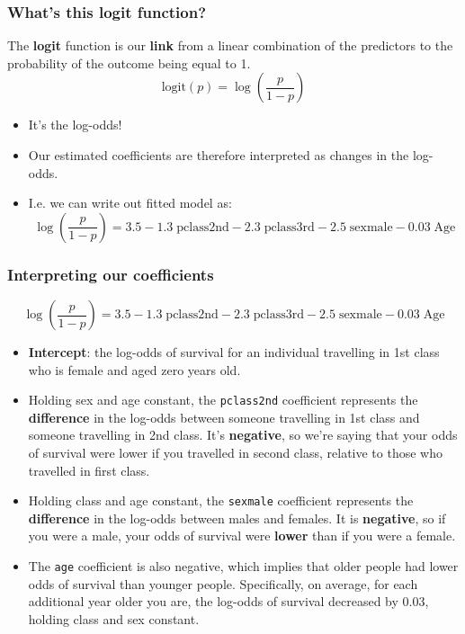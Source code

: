 \documentclass[a4paper]{article}
\begin{document}
\subsubsection{What's this logit function?}
The \textbf{logit} function is our \textbf{link} from a linear combination of the predictors to the probability of the outcome being equal to 1.
\[
	\mathrm{logit}(p) = \log\left(\frac{p}{1-p}\right)
\]
\begin{itemize}
	\item It's the log-odds!
	\item Our estimated coefficients are therefore interpreted as changes in the log-odds.
	\item I.e. we can write out fitted model as:
	\[  
		\log\left(\frac{p}{1-p}\right) = 3.5 - 1.3\;\text{pclass2nd} - 2.3\;\text{pclass3rd} - 2.5\;\text{sexmale} - 0.03\;\text{Age}
	\]
\end{itemize}
\subsubsection{Interpreting our coefficients}
\[
	\log\left(\frac{p}{1-p}\right) = 3.5 - 1.3\;\text{pclass2nd} - 2.3\;\text{pclass3rd} - 2.5\;\text{sexmale} - 0.03\;\text{Age}
\]
\begin{itemize}
	\item \textbf{Intercept}: the log-odds of survival for an individual travelling in 1st class who is female and aged zero years old.
	\item Holding sex and age constant, the \lstinline|pclass2nd| coefficient represents the \textbf{difference} in the log-odds between someone travelling in 1st class and someone travelling in 2nd class. It's \textbf{negative}, so we're saying that your odds of survival were lower if you travelled in second class, relative to those who travelled in first class.
	\item Holding class and age constant, the \lstinline|sexmale| coefficient represents the \textbf{difference} in the log-odds between males and females. It is \textbf{negative}, so if you were a male, your odds of survival were \textbf{lower} than if you were a female.
	\item The \lstinline|age| coefficient is also negative, which implies that older people had lower odds of survival than younger people. Specifically, on average, for each additional year older you are, the log-odds of survival decreased by 0.03, holding class and sex constant.
\end{itemize}
\end{document}
